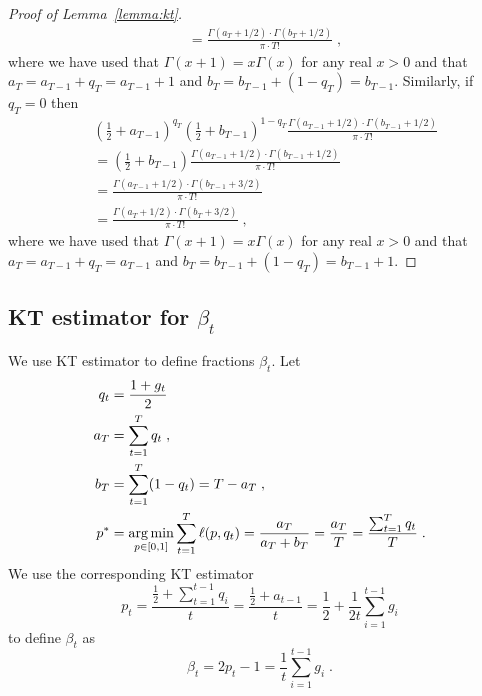 \begin{proof}[Proof of Lemma~\ref{lemma:kt}]
\begin{align*}
& = \frac{\Gamma(a_{T} + 1/2) \cdot \Gamma(b_T + 1/2)}{\pi \cdot T!} \; ,
\end{align*}
where we have used that $\Gamma(x+1) = x \Gamma(x)$ for any real $x > 0$ and that $a_T = a_{T-1} + q_T = a_{T-1} + 1$ and $b_T = b_{T-1} + (1-q_T) = b_{T-1}$.
Similarly, if $q_T = 0$ then
\begin{align*}
& \left( \frac{1}{2} + a_{T-1} \right)^{q_T} \left( \frac{1}{2} + b_{T-1} \right)^{1-q_T} \frac{\Gamma(a_{T-1} + 1/2) \cdot \Gamma(b_{T-1} + 1/2)}{\pi \cdot T!} \\
& = \left( \frac{1}{2} + b_{T-1} \right) \frac{\Gamma(a_{T-1} + 1/2) \cdot \Gamma(b_{T-1} + 1/2)}{\pi \cdot T!} \\
& = \frac{\Gamma(a_{T-1} + 1/2) \cdot \Gamma(b_{T-1} + 3/2)}{\pi \cdot T!} \\
& = \frac{\Gamma(a_T + 1/2) \cdot \Gamma(b_T + 3/2)}{\pi \cdot T!} \; ,
\end{align*}
where we have used that $\Gamma(x+1) = x \Gamma(x)$ for any real $x > 0$ and that $a_T = a_{T-1} + q_T = a_{T-1}$ and $b_T = b_{T-1} + (1-q_T) = b_{T-1} + 1$.
\end{proof}


\subsection{KT estimator for $\beta_t$}

We use KT estimator to define fractions $\beta_t$. Let
\begin{align*}
q_t & = \frac{1 + g_t}{2} \\
a_T & = \sum_{t=1}^T q_t \; , \\
b_T & = \sum_{t=1}^T (1 - q_t) = T - a_T \; , \\
p^* & =  \operatorname*{arg\,min}_{p \in [0,1]} \sum_{t=1}^T \ell(p, q_t)
      = \frac{a_T}{a_T + b_T}
      = \frac{a_T}{T} = \frac{\sum_{t=1}^T q_t}{T} \; .
\end{align*}
We use the corresponding KT estimator
$$
p_t = \frac{\frac{1}{2} + \sum_{t=1}^{t-1} q_i}{t} = \frac{\frac{1}{2} + a_{t-1}}{t} = \frac{1}{2} + \frac{1}{2t} \sum_{i=1}^{t-1} g_i
$$
to define $\beta_t$ as
$$
\beta_t = 2p_t - 1 = \frac{1}{t} \sum_{i=1}^{t-1} g_i \; .
$$

